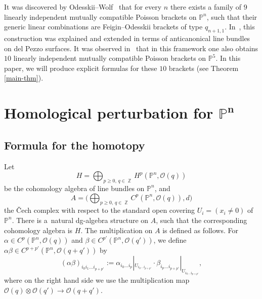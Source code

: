 \documentclass[pdftex]{sigma}
\numberwithin{equation}{section}
\DeclareMathOperator\Z{\mathbb Z}
\renewcommand{\P}{{\mathbb P}}
\newcommand{\OO}{{\mathcal O}}
\begin{document}
It was discovered by Odesskii--Wolf~\cite{OW} that for every $n$ there exists a family of $9$ linearly independent mutually compatible Poisson brackets on $\P^n$,
such that their generic linear combinations are Feigin--Odesskii brackets of type $q_{n+1,1}$. In~\cite{HP}, this construction was explained and extended in terms of anticanonical
line bundles on del Pezzo surfaces. It was observed in~\cite[Example~4.6]{HP} that in this framework one also obtains $10$ linearly independent mutually compatible
Poisson brackets on $\P^5$. In this paper, we will produce explicit formulas for these $10$ brackets (see Theorem \ref{main-thm}).

\section[Homological perturbation for P\^{}n]{Homological perturbation for $\boldsymbol{\P^n}$}

\subsection{Formula for the homotopy}

Let
\[
H=\bigoplus_{p\geq 0,\, q\in \Z}H^p(\P^n,\OO(q))
\]
be the cohomology algebra of line bundles on $\P^n$, and
\[
A=\Big(\bigoplus_{p\geq 0,\, q\in\Z} C^p (\P^n,\OO(q)),d\Big)
\]
the \v{C}ech complex with respect to the standard open covering $U_i=(x_i\neq 0)$ of $\P^n$.
There is a~natural dg-algebra structure on $A$, such that the corresponding cohomology algebra is
$H$. The multiplication on $A$ is defined as follows. For $\alpha \in C^p(\P^n,\OO(q))$ and $\beta\in C^{p'}(\P^n,\OO(q'))$, we define $\alpha\beta\in C^{p+p'}(\P^n,\OO(q+q'))$ by
\[
(\alpha\beta)_{i_0i_1\dots i_{p+p'}}:=\alpha_{i_0\dots i_p}|_{U_{i_0\dots i_{p+p'}}}\cdot \beta_{i_p\dots i_{p+p'}}|_{U_{i_0\dots i_{p+p'}}},
\]
where on the right hand side we use the multiplication map $\OO(q)\otimes \OO(q')\to \OO(q+q')$.
\end{document}
